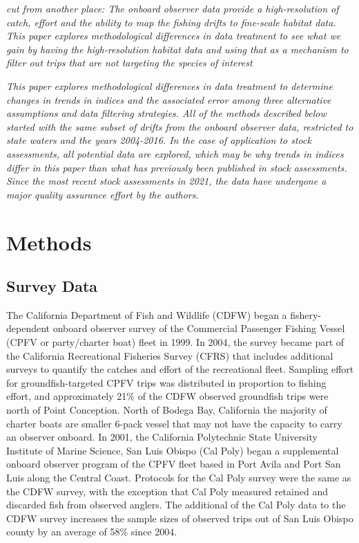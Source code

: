 \documentclass[
  authoryear,
  preprint,
  3p]{elsarticle}
\begin{document}
\emph{cut from another place: The onboard observer data provide a
high-resolution of catch, effort and the ability to map the fishing
drifts to fine-scale habitat data. This paper explores methodological
differences in data treatment to see what we gain by having the
high-resolution habitat data and using that as a mechanism to filter out
trips that are not targeting the species of interest}

\emph{This paper explores methodological differences in data treatment
to determine changes in trends in indices and the associated error among
three alternative assumptions and data filtering strategies. All of the
methods described below started with the same subset of drifts from the
onboard observer data, restricted to state waters and the years
2004-2016. In the case of application to stock assessments, all
potential data are explored, which may be why trends in indices differ
in this paper than what has previously been published in stock
assessments. Since the most recent stock assessments in 2021, the data
have undergone a major quality assurance effort by the authors.}

\hypertarget{methods}{%
\section{Methods}\label{methods}}

\hypertarget{survey-data}{%
\subsection{Survey Data}\label{survey-data}}

The California Department of Fish and Wildlife (CDFW) began a
fishery-dependent onboard observer survey of the Commercial Passenger
Fishing Vessel (CPFV or party/charter boat) fleet in 1999. In 2004, the
survey became part of the California Recreational Fisheries Survey
(CFRS) that includes additional surveys to quantify the catches and
effort of the recreational fleet. Sampling effort for
groundfish-targeted CPFV trips was distributed in proportion to fishing
effort, and approximately 21\% of the CDFW observed groundfish trips
were north of Point Conception. North of Bodega Bay, California the
majority of charter boats are smaller 6-pack vessel that may not have
the capacity to carry an observer onboard. In 2001, the California
Polytechnic State University Institute of Marine Science, San Luis
Obispo (Cal Poly) began a supplemental onboard observer program of the
CPFV fleet based in Port Avila and Port San Luis along the Central
Coast. Protocols for the Cal Poly survey were the same as the CDFW
survey, with the exception that Cal Poly measured retained and discarded
fish from observed anglers. The additional of the Cal Poly data to the
CDFW survey increases the sample sizes of observed trips out of San Luis
Obispo county by an average of 58\% since 2004.
\end{document}
